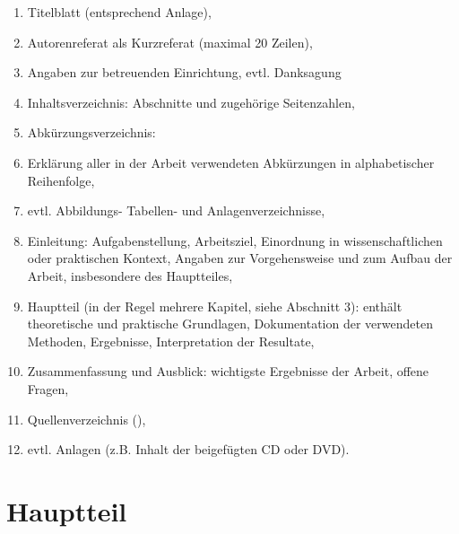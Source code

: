 \begin{enumerate}
	\item Titelblatt (entsprechend Anlage),
    \item Autorenreferat als Kurzreferat (maximal 20 Zeilen),
    \item Angaben zur betreuenden Einrichtung, evtl. Danksagung
    \item Inhaltsverzeichnis: Abschnitte und zugehörige Seitenzahlen,
    \item Abkürzungsverzeichnis:
    \item Erklärung aller in der Arbeit verwendeten Abkürzungen in alphabetischer Reihenfolge,
    \item evtl. Abbildungs- Tabellen- und Anlagenverzeichnisse,
    \item Einleitung: Aufgabenstellung, Arbeitsziel, Einordnung in wissenschaftlichen oder praktischen  Kontext, Angaben zur Vorgehensweise und zum Aufbau der Arbeit, insbesondere des Hauptteiles,
    \item Hauptteil (in der Regel mehrere Kapitel, siehe Abschnitt 3): enthält theoretische und praktische Grundlagen, Dokumentation der verwendeten Methoden, Ergebnisse, Interpretation der Resultate,
    \item Zusammenfassung und Ausblick: wichtigste Ergebnisse der Arbeit, offene Fragen,
    \item Quellenverzeichnis (),
    \item evtl. Anlagen (z.B. Inhalt der beigefügten CD oder DVD).
\end{enumerate}

\section{Hauptteil}
\label{sec:hauptteil}

